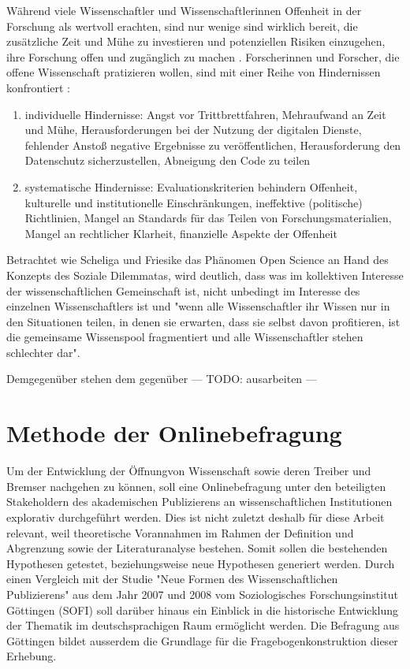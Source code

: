 Während viele Wissenschaftler und Wissenschaftlerinnen Offenheit in der Forschung als wertvoll erachten, sind nur wenige sind wirklich bereit, die zusätzliche Zeit und Mühe zu investieren und potenziellen Risiken einzugehen, ihre Forschung offen und zugänglich zu machen \cite{Scheliga_2014} \cite{Procter_2010}. Forscherinnen und Forscher, die offene Wissenschaft pratizieren wollen, sind mit einer Reihe von Hindernissen konfrontiert \cite{Scheliga_2014}: 
\begin{enumerate}
\item individuelle Hindernisse: Angst vor Trittbrettfahren, Mehraufwand an Zeit und Mühe, Herausforderungen bei der Nutzung der digitalen Dienste, fehlender Anstoß negative Ergebnisse zu veröffentlichen, Herausforderung den Datenschutz sicherzustellen, Abneigung den Code zu teilen
\item systematische Hindernisse: Evaluationskriterien behindern Offenheit, kulturelle und institutionelle Einschränkungen, ineffektive (politische) Richtlinien, Mangel an Standards für das Teilen von Forschungsmaterialien, Mangel an rechtlicher Klarheit, finanzielle Aspekte der Offenheit
\end{enumerate}

Betrachtet wie Scheliga und Friesike das Phänomen Open Science an Hand des Konzepts des Soziale Dilemmatas, wird deutlich, dass was im kollektiven Interesse der wissenschaftlichen Gemeinschaft ist, nicht unbedingt im Interesse des einzelnen Wissenschaftlers ist und "wenn alle Wissenschaftler ihr Wissen nur in den Situationen teilen, in denen sie erwarten, dass sie selbst davon profitieren, ist die gemeinsame Wissenspool fragmentiert und alle Wissenschaftler stehen schlechter dar"\cite{Scheliga_2014}. 

Demgegenüber stehen dem gegenüber  --- TODO: ausarbeiten ---

\section{Methode der Onlinebefragung}
Um der Entwicklung der Öffnungvon Wissenschaft sowie deren Treiber und Bremser nachgehen zu können, soll eine Onlinebefragung unter den beteiligten Stakeholdern des akademischen Publizierens an wissenschaftlichen Institutionen explorativ durchgeführt werden. Dies ist nicht zuletzt deshalb für diese Arbeit relevant, weil theoretische Vorannahmen im Rahmen der Definition und Abgrenzung sowie der Literaturanalyse bestehen. Somit sollen die bestehenden Hypothesen getestet, beziehungsweise neue Hypothesen generiert werden. Durch einen Vergleich mit der Studie "Neue Formen des Wissenschaftlichen Publizierens" aus dem Jahr 2007 und 2008 vom Soziologisches Forschungsinstitut Göttingen (SOFI) soll darüber hinaus ein Einblick in die historische Entwicklung der Thematik im deutschsprachigen Raum ermöglicht werden. Die Befragung aus Göttingen bildet ausserdem die Grundlage für die Fragebogenkonstruktion dieser Erhebung. 

